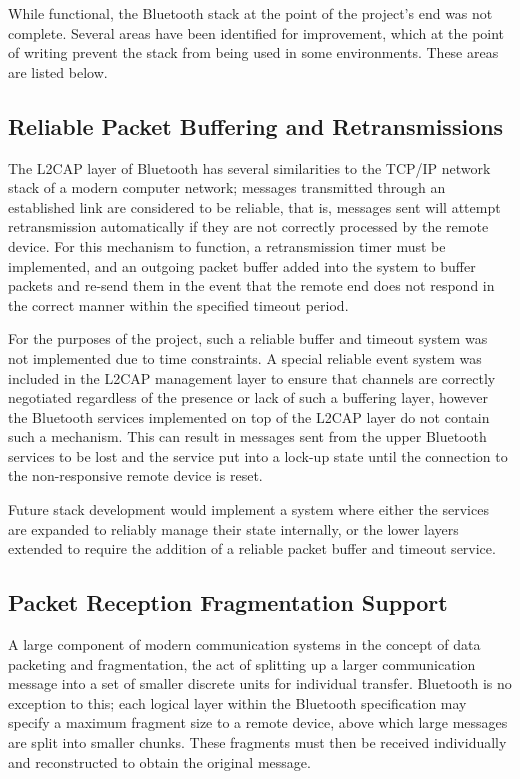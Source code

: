While functional, the Bluetooth stack at the point of the project's end was not complete. Several areas have been identified for improvement, which at the point of writing prevent the stack from being used in some environments. These areas are listed below.

\subsection{Reliable Packet Buffering and Retransmissions}

The L2CAP layer of Bluetooth has several similarities to the TCP/IP network stack of a modern computer network; messages transmitted through an established link are considered to be reliable, that is, messages sent will attempt retransmission automatically if they are not correctly processed by the remote device. For this mechanism to function, a retransmission timer must be implemented, and an outgoing packet buffer added into the system to buffer packets and re-send them in the event that the remote end does not respond in the correct manner within the specified timeout period.

For the purposes of the project, such a reliable buffer and timeout system was not implemented due to time constraints. A special reliable event system was included in the L2CAP management layer to ensure that channels are correctly negotiated regardless of the presence or lack of such a buffering layer, however the Bluetooth services implemented on top of the L2CAP layer do not contain such a mechanism. This can result in messages sent from the upper Bluetooth services to be lost and the service put into a lock-up state until the connection to the non-responsive remote device is reset.

Future stack development would implement a system where either the services are expanded to reliably manage their state internally, or the lower layers extended to require the addition of a reliable packet buffer and timeout service.

\subsection{Packet Reception Fragmentation Support}

A large component of modern communication systems in the concept of data packeting and fragmentation, the act of splitting up a larger communication message into a set of smaller discrete units for individual transfer. Bluetooth is no exception to this; each logical layer within the Bluetooth specification may specify a maximum fragment size to a remote device, above which large messages are split into smaller chunks. These fragments must then be received individually and reconstructed to obtain the original message.

